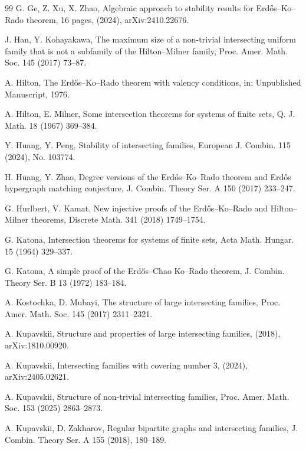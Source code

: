 \documentclass[11pt]{article}
\numberwithin{equation}{section}
\begin{document}
\begin{thebibliography}{99}
G. Ge, Z. Xu, X. Zhao, 
Algebraic approach to stability results for Erd\H{o}s--Ko--Rado theorem, 
16 pages, (2024), arXiv:2410.22676. 

J. Han, Y. Kohayakawa, The maximum size of a non-trivial intersecting uniform family that is not a subfamily of the Hilton--Milner family, Proc. Amer. Math. Soc. 145 (2017) 73--87.





A. Hilton, The Erd\H{o}s--Ko--Rado theorem with valency conditions, in: Unpublished Manuscript, 1976.

 A. Hilton, E. Milner, Some intersection theorems for systems of finite sets, Q. J. Math. 18 (1967) 369--384.

 Y. Huang, Y. Peng, Stability of intersecting families, European J. Combin. 115 (2024), No. 103774.

H. Huang, Y. Zhao, 
Degree versions of the Erd\H{o}s--Ko--Rado theorem 
and Erd\H{o}s hypergraph matching conjecture, 
J. Combin. Theory Ser. A 150 (2017) 233--247. 

G. Hurlbert, V. Kamat, 
New injective proofs of the Erd\H{o}s--Ko--Rado and Hilton--Milner
theorems, Discrete Math. 341 (2018) 1749--1754.


G. Katona, Intersection theorems for systems of finite sets, Acta Math. Hungar. 15 (1964) 329--337. 

 G. Katona, 
 A simple proof of the Erd\H{o}s--Chao Ko--Rado theorem, 
 J. Combin. Theory Ser. B 13 (1972) 183--184.

A. Kostochka, D. Mubayi, The structure of large intersecting families, Proc. Amer. Math. Soc. 145 (2017) 2311--2321. 

A. Kupavskii, Structure and properties of large intersecting families, (2018), arXiv:1810.00920.

A. Kupavskii,  Intersecting families with covering number $3$, (2024), arXiv:2405.02621.

A. Kupavskii, Structure of non-trivial intersecting families, Proc. Amer. Math. Soc. 153 (2025) 2863--2873.

A. Kupavskii, D. Zakharov, 
Regular bipartite graphs and intersecting families, J. Combin.
Theory Ser. A 155 (2018), 180--189.


\end{thebibliography}
\end{document}
